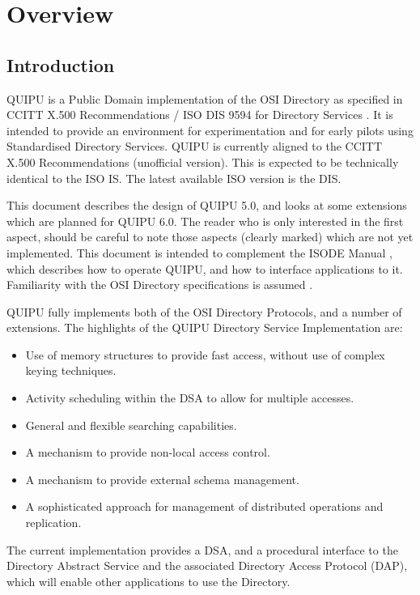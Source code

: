 \chapter {Overview}

\section {Introduction}

QUIPU is a Public Domain implementation of the OSI Directory as 
specified in CCITT X.500 Recommendations /
ISO DIS 9594 for Directory Services \cite{ISO.Directory}
\cite{CCITT.Directory}.
It is intended to provide an environment for experimentation and for early
pilots using Standardised Directory Services.  QUIPU is currently aligned to
the CCITT X.500 Recommendations (unofficial version).  This is expected to
be technically identical to the ISO IS.  The latest available ISO version is
the DIS.  

This document describes the design of QUIPU 5.0, and looks at some
extensions which are planned for QUIPU 6.0. 
The reader who is only interested in the first aspect, should be careful to
note those aspects (clearly marked) which are not yet implemented.
This document is intended to complement
the ISODE Manual \cite{QUIPU.Manual}, which describes how to operate QUIPU, and how
to interface applications to it.  
Familiarity with the OSI
Directory specifications is assumed \cite{CCITT.Directory}.


QUIPU fully implements both of the OSI Directory Protocols, and a number of
extensions.
The highlights of the QUIPU Directory Service
Implementation are:

\begin {itemize}
\item
Use of memory structures to provide fast access, without use of
complex keying techniques.
\item
Activity scheduling within the DSA to allow for multiple accesses.
\item
General and flexible searching capabilities.
\item
A mechanism to provide non-local access control.
\item
A mechanism to provide external schema management.
\item
A sophisticated approach for management of distributed operations and
replication.
\end {itemize}

The current implementation provides a DSA, and a procedural interface to the
Directory Abstract Service and the associated Directory Access Protocol
(DAP), which will enable other applications to use the Directory.

